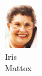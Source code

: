 \begin{figure}[H]
\begin{subfigure}[b]{0.1\textwidth}
                \includegraphics[width=\textwidth]{mugs/MattoxIris}
                \caption*{Iris \\ Mattox}
        \end{subfigure}
                        ~ %
        \begin{subfigure}[b]{0.1\textwidth}

\end{subfigure}
\end{figure}
